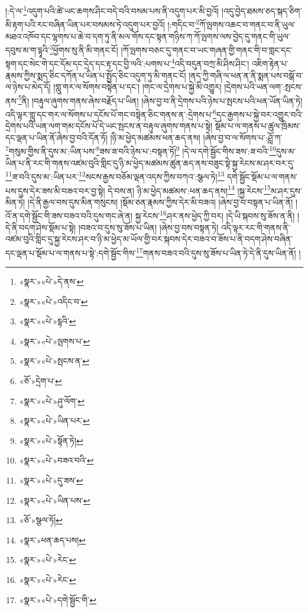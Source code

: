 །:དེ་ལ་\footnote{«སྣར་»«པེ་»དེ་ནས་}འདུག་པའི་ཚེ་ཡང་ཆགས་ཤིང་བདེ་བའི་བསམ་པས་ནི་འདུག་པར་མི་བྱའོ། །འདུ་བྱེད་ཐམས་ཅད་སྐད་ཅིག་མི་རྟག་པའི་རང་བཞིན་ཡིན་པར་བསམས་ཏེ་འདུག་པར་བྱའོ། །:གདིང་བ་\footnote{«སྣར་»«པེ་»འདིང་བ་}ཀོ་ལྤགས་འཆང་བ་གནང་བ་ནི་ཡུལ་མཐའ་འཁོབ་དང་ལྷགས་པ་ཆེ་བ་དག་ཏུ་ནི་མལ་གོས་དང་སྟན་གཉིས་ཀ་ཀོ་ལྤགས་ལས་བྱེད་དུ་གནང་གི་ཡུལ་དབུས་མ་ག་དྷཱའི་\footnote{«སྣར་»«པེ་»དྷའི་}ཕྱོགས་སུ་ནི་མི་གནང་ངོ། །ཀོ་ལྤགས་བཅང་དུ་གནང་བ་ཡང་གཞན་གྱི་གནང་གི་བ་གླང་དང་སྟག་དང་སེང་གེ་དང་དོམ་དང་དྲེད་དང་རྟ་དང་བྱི་ལའི་:པགས་པ་\footnote{«སྣར་»«པེ་»ལྤགས་པ་}འདི་བདུན་བཀྲ་མི་ཤིས་ཤིང་། འཇིག་རྟེན་པ་རྣམས་ཀྱིས་སྨད་ཅིང་དཀོན་པ་ཡིན་པ་སྤྱོད་ཅིང་འདུག་ཏུ་མི་གནང་ངོ། །ནད་ཀྱི་གཞི་ལ་ཕན་ན་ནི་སྨན་པས་བསྒོ་བ་ལ་ཉེས་པ་མེད་དོ། །གླུ་གར་ལ་སོགས་བསྟེན་པ་དང་། །གང་ལ་དྲེགས་པ་སྐྱེ་མི་འགྱུར། །དྲེགས་པའི་ཡན་ལག་:སྤངས་ནས་\footnote{«སྣར་»«པེ་»སྤངས་ན་}ནི། །བརྟུལ་ཞུགས་གནས་ཞེས་བརྗོད་པ་ཡིན། །ཞེས་བྱ་བ་ནི་དྲེགས་པའི་ཉེས་པ་སྤངས་པའི་ཕན་ཡོན་ཡིན་ཏེ། འདི་ལྟར་གླུ་དང་གར་ལ་སོགས་པ་དངོས་པོ་གང་བསྟེན་ཅིང་གནས་ན་:དྲེགས་པ་\footnote{«ཅོ་»དྲེག་པ་}དང་རྒྱགས་པ་སྐྱེ་བར་འགྱུར་བའི་དྲེགས་པའི་ཡན་ལག་གམ་དངོས་པོ་དེ་ཡང་སྤངས་ན་བརྟུལ་ཞུགས་གནས་པ་སྟེ། སྡོམ་པ་ལ་གནས་པ་ཚུལ་ཁྲིམས་དང་ལྡན་པ་ཡིན་ནོ་ཞེས་བྱ་བའི་དོན་ཏོ། །ཉི་མ་ཕྱེད་མཚམས་ཕན་ཆད་ནས། །ཞེས་བྱ་བ་ལ་སོགས་པ་:ཤློ་ཀ་\footnote{«སྣར་»«པེ་»ཤུ་ལོག་}གསུམ་གྱིས་ནི་དུས་མ་:ཡིན་པས་\footnote{«སྣར་»«པེ་»ཡིན་པར་}ཟས་ཟ་བའི་ཉེས་པ་:བསྟན་ཏོ།\footnote{«སྣར་»«པེ་»སྟོན་ཏེ།} །དེ་ལ་དགེ་སྦྱོང་གིས་ཟས་:ཟ་བའི་\footnote{«སྣར་»«པེ་»བཟའ་བའི་}དུས་མ་ཡིན་པ་ནི་རང་གི་གནས་འཛམ་བུའི་གླིང་དུ་ཉི་མ་ཕྱེད་མཚམས་ཚུན་ཆད་ནས་བཟུང་སྟེ་སྐྱ་རེངས་མ་ཤར་བར་དུ་\footnote{«སྣར་»«པེ་»དུ་ཟས་}ཟ་བའི་དུས་མ་:ཡིན་པར་\footnote{«སྣར་»«པེ་»ཡིན་པས་}སངས་རྒྱས་བཅོམ་ལྡན་འདས་ཀྱིས་བཀའ་:སྩལ་ཏེ།\footnote{«ཅོ་»སྩལ་ཏོ།} དགེ་སྦྱོང་སྡོམ་པ་ལ་གནས་པས་དུས་དེར་ཟས་མི་བཟའ་བར་བྱ་སྟེ། དེ་བས་ན། ཉི་མ་ཕྱེད་མཚམས་:ཕན་ཆད་ནས།\footnote{«སྣར་»ཕན་ཆད་པས།} །སྐྱ་རེངས་\footnote{«སྣར་»«པེ་»རེང་}མ་ཤར་དུས་མིན་ཏེ། །དེ་ནི་རྒྱལ་བས་དུས་མིན་གསུངས། །སྡོམ་ཅན་རྣམས་ཀྱིས་དེར་མི་བཟའ། །ཞེས་བྱ་བ་བསྟན་པ་ཡིན་ནོ། །འོ་ན་དགེ་སྦྱོང་གི་ཟས་བཟའ་བའི་དུས་གང་ཞེ་ན། སྐྱ་རེངས་\footnote{«སྣར་»«པེ་»རེང་}ཤར་ནས་ཕྱེད་ཀྱི་བར། །དེ་ཡི་སྐབས་སུ་ཟོས་ན་ནི། །དེ་ནི་བདག་ཤེས་སྡོམ་པ་སྟེ། །བཟའ་བ་དུས་སུ་ཟོས་པ་ཡིན། །ཞེས་བྱ་བས་བསྟན་ཏེ། འདི་ལྟར་རང་གི་གནས་ནི་འཛམ་བུའི་གླིང་དུ་སྐྱ་རེངས་ཤར་བ་ཉི་མ་ཕྱེད་མ་ཡོལ་གྱི་བར་སྐབས་དེར་བཟའ་བ་ཟོས་པ་ནི་བདག་ཤེས་བཞིན་དང་ལྡན་པ་སྡོམ་པ་ལ་གནས་པ་སྟེ་:དགེ་སྦྱོང་གིས་\footnote{«སྣར་»«པེ་»དགེ་སྦྱོང་གི་}གནས་བཟའ་བའི་དུས་སུ་ཟོས་པ་ཡིན་ཏེ་དེ་ནི་དུས་ཡིན་ནོ། །

